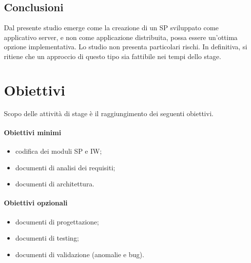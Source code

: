 \subsection{Conclusioni}
Dal presente studio emerge come la creazione di un SP sviluppato come applicativo server, e non come applicazione distribuita, possa essere un’ottima opzione implementativa. Lo studio non presenta particolari rischi. In definitiva, si ritiene che un approccio di questo tipo sia fattibile nei tempi dello stage.

\section{Obiettivi}

Scopo delle attività di stage è il raggiungimento dei seguenti obiettivi.\\
\paragraph{Obiettivi minimi}
\begin{itemize}
    \item codifica dei moduli SP e IW;
    \item documenti di analisi dei requisiti;
    \item documenti di architettura.
\end{itemize}
    
\paragraph{Obiettivi opzionali}
\begin{itemize}
    \item documenti di progettazione;
    \item documenti di testing;
    \item documenti di validazione (anomalie e bug).
\end{itemize}
    

